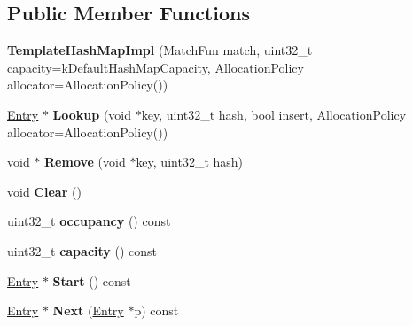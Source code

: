 \subsection*{Public Member Functions}
\begin{DoxyCompactItemize}
\item 
\hypertarget{classv8_1_1internal_1_1_template_hash_map_impl_af9ef8882294388c3de6c339f0d88ad45}{}{\bfseries Template\+Hash\+Map\+Impl} (Match\+Fun match, uint32\+\_\+t capacity=k\+Default\+Hash\+Map\+Capacity, Allocation\+Policy allocator=Allocation\+Policy())\label{classv8_1_1internal_1_1_template_hash_map_impl_af9ef8882294388c3de6c339f0d88ad45}

\item 
\hypertarget{classv8_1_1internal_1_1_template_hash_map_impl_a2ed3866de54b5dd38ef2b97d548e8287}{}\hyperlink{structv8_1_1internal_1_1_template_hash_map_impl_1_1_entry}{Entry} $\ast$ {\bfseries Lookup} (void $\ast$key, uint32\+\_\+t hash, bool insert, Allocation\+Policy allocator=Allocation\+Policy())\label{classv8_1_1internal_1_1_template_hash_map_impl_a2ed3866de54b5dd38ef2b97d548e8287}

\item 
\hypertarget{classv8_1_1internal_1_1_template_hash_map_impl_a4144fe2e3ff1c7496d12678e20148e0e}{}void $\ast$ {\bfseries Remove} (void $\ast$key, uint32\+\_\+t hash)\label{classv8_1_1internal_1_1_template_hash_map_impl_a4144fe2e3ff1c7496d12678e20148e0e}

\item 
\hypertarget{classv8_1_1internal_1_1_template_hash_map_impl_a3ee691337d597cfbb218c38332a6e3a7}{}void {\bfseries Clear} ()\label{classv8_1_1internal_1_1_template_hash_map_impl_a3ee691337d597cfbb218c38332a6e3a7}

\item 
\hypertarget{classv8_1_1internal_1_1_template_hash_map_impl_a1b12dfbef0f39e5fee47a75f52479924}{}uint32\+\_\+t {\bfseries occupancy} () const \label{classv8_1_1internal_1_1_template_hash_map_impl_a1b12dfbef0f39e5fee47a75f52479924}

\item 
\hypertarget{classv8_1_1internal_1_1_template_hash_map_impl_a94411e49edab1950813f5e62c2fdf4a3}{}uint32\+\_\+t {\bfseries capacity} () const \label{classv8_1_1internal_1_1_template_hash_map_impl_a94411e49edab1950813f5e62c2fdf4a3}

\item 
\hypertarget{classv8_1_1internal_1_1_template_hash_map_impl_aa2f53fa47db0ec8d3370496d2f63ace0}{}\hyperlink{structv8_1_1internal_1_1_template_hash_map_impl_1_1_entry}{Entry} $\ast$ {\bfseries Start} () const \label{classv8_1_1internal_1_1_template_hash_map_impl_aa2f53fa47db0ec8d3370496d2f63ace0}

\item 
\hypertarget{classv8_1_1internal_1_1_template_hash_map_impl_aa2b27d2e082f0059860c347dc50bc1bf}{}\hyperlink{structv8_1_1internal_1_1_template_hash_map_impl_1_1_entry}{Entry} $\ast$ {\bfseries Next} (\hyperlink{structv8_1_1internal_1_1_template_hash_map_impl_1_1_entry}{Entry} $\ast$p) const \label{classv8_1_1internal_1_1_template_hash_map_impl_aa2b27d2e082f0059860c347dc50bc1bf}

\end{DoxyCompactItemize}
